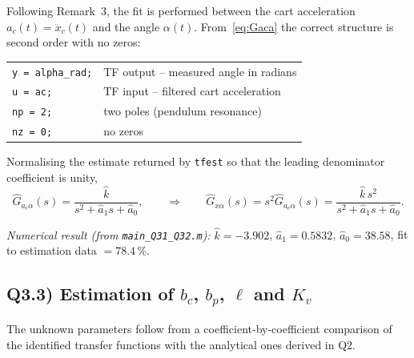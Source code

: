\documentclass[11pt,a4paper]{article}
\newcommand{\ddd}[1]{\ddot{#1}}
\renewcommand{\l}{\ell}
\begin{document}
Following Remark~3, the fit is performed between the cart acceleration
$a_c(t)=\ddd x_c(t)$ and the angle $\alpha(t)$. From~\eqref{eq:Gaca} the
correct structure is second order with no zeros:
\begin{center}
\begin{tabular}{@{}ll@{}}
\toprule
\texttt{y  = alpha\_rad;} & TF output -- measured angle in radians \\
\texttt{u  = ac;}         & TF input  -- filtered cart acceleration \\
\texttt{np = 2;}          & two poles (pendulum resonance) \\
\texttt{nz = 0;}          & no zeros \\
\bottomrule
\end{tabular}
\end{center}
Normalising the estimate returned by \texttt{tfest} so that the leading
denominator coefficient is unity,
\begin{equation}
\hat G_{a_c\alpha}(s)
= \frac{\hat k}{s^{2}+\hat a_1 s+\hat a_0},
\qquad\Longrightarrow\qquad
\hat G_{x\alpha}(s)=s^{2}\hat G_{a_c\alpha}(s)
= \frac{\hat k\, s^{2}}{s^{2}+\hat a_1 s+\hat a_0}.
\label{eq:id_aca}
\end{equation}

\emph{Numerical result (from \texttt{main\_Q31\_Q32.m}):}
$\hat k = -3.902$, $\hat a_1 = 0.5832$,
$\hat a_0 = 38.58$,
fit to estimation data $=78.4\,\%$.

\subsection*{Q3.3) Estimation of $b_c$, $b_p$, $\l$ and $K_v$}

The unknown parameters follow from a coefficient-by-coefficient comparison
of the identified transfer functions with the analytical ones derived in
Q2.
\end{document}
